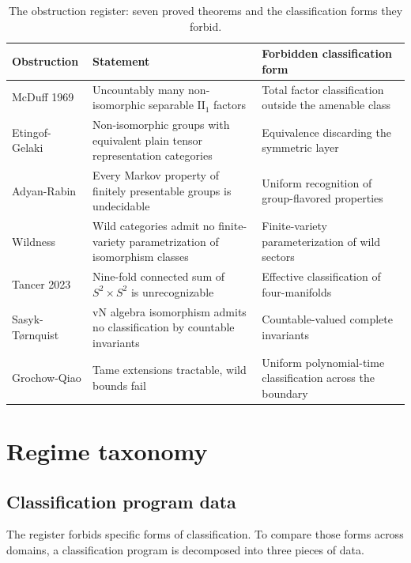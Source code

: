 \documentclass[11pt,letterpaper]{article}
\theoremstyle{definition}
\theoremstyle{remark}
\begin{document}
\begin{table}[ht]
\centering
\caption{The obstruction register: seven proved theorems and the classification forms they forbid.}
\label{tab:register}
\small
\begin{tabular}{L{3.2cm}L{4.6cm}L{4.6cm}}
\toprule
Obstruction & Statement & Forbidden classification form \\
\midrule
McDuff 1969 & Uncountably many non-isomorphic separable $\mathrm{II}_1$ factors & Total factor classification outside the amenable class \\
Etingof-Gelaki & Non-isomorphic groups with equivalent plain tensor representation categories & Equivalence discarding the symmetric layer \\
Adyan-Rabin & Every Markov property of finitely presentable groups is undecidable & Uniform recognition of group-flavored properties \\
Wildness & Wild categories admit no finite-variety parametrization of isomorphism classes & Finite-variety parameterization of wild sectors \\
Tancer 2023 & Nine-fold connected sum of $S^2 \times S^2$ is unrecognizable & Effective classification of four-manifolds \\
Sasyk-Tørnquist & vN algebra isomorphism admits no classification by countable invariants & Countable-valued complete invariants \\
Grochow-Qiao & Tame extensions tractable, wild bounds fail & Uniform polynomial-time classification across the boundary \\
\bottomrule
\end{tabular}
\end{table}

\section{Regime taxonomy}

\subsection{Classification program data}

The register forbids specific forms of classification. To compare those forms across domains, a classification program is decomposed into three pieces of data.
\end{document}

